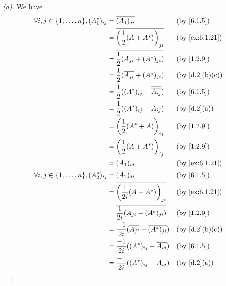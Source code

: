 \begin{proof}[(a)]
  We have
  \begin{align*}
    \forall i, j \in \set{1, \dots, n}, (A_1^*)_{i j} & = \conj{(A_1)_{j i}}                                  &  & \by{6.1.5}     \\
                                                      & = \conj{\pa{\frac{1}{2} (A + A^*)}_{j i}}             &  & \by{ex:6.1.21} \\
                                                      & = \conj{\frac{1}{2} (A_{j i} + (A^*)_{j i})}          &  & \by{1.2.9}     \\
                                                      & = \frac{1}{2} (\conj{A_{j i}} + \conj{(A^*)_{j i}})   &  & \by{d.2}[b,c]  \\
                                                      & = \frac{1}{2} ((A^*)_{i j} + \conj{\conj{A_{i j}}})   &  & \by{6.1.5}     \\
                                                      & = \frac{1}{2} ((A^*)_{i j} + A_{i j})                 &  & \by{d.2}[a]    \\
                                                      & = \pa{\frac{1}{2} (A^* + A)}_{i j}                    &  & \by{1.2.9}     \\
                                                      & = \pa{\frac{1}{2} (A + A^*)}_{i j}                    &  & \by{1.2.9}     \\
                                                      & = (A_1)_{i j}                                         &  & \by{ex:6.1.21} \\
    \forall i, j \in \set{1, \dots, n}, (A_2^*)_{i j} & = \conj{(A_2)_{j i}}                                  &  & \by{6.1.5}     \\
                                                      & = \conj{\pa{\frac{1}{2i} (A - A^*)}_{j i}}            &  & \by{ex:6.1.21} \\
                                                      & = \conj{\frac{1}{2i} (A_{j i} - (A^*)_{j i})}         &  & \by{1.2.9}     \\
                                                      & = \frac{-1}{2i} (\conj{A_{j i}} - \conj{(A^*)_{j i}}) &  & \by{d.2}[b,c]  \\
                                                      & = \frac{-1}{2i} ((A^*)_{i j} - \conj{\conj{A_{i j}}}) &  & \by{6.1.5}     \\
                                                      & = \frac{-1}{2i} ((A^*)_{i j} - A_{i j})               &  & \by{d.2}[a]    \\

\end{align*}
\end{proof}
